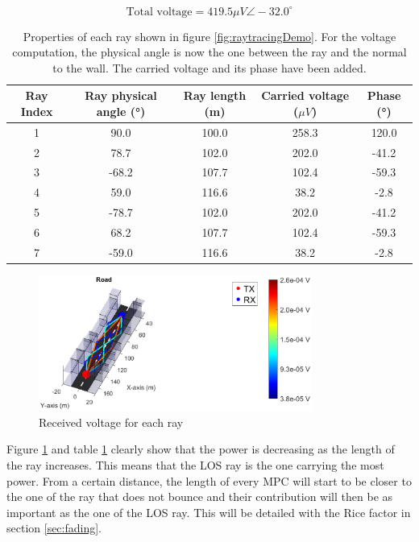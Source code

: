 \documentclass[10pt,a4paper]{ULBreport}
\begin{document}
\begin{equation*}
    \text{Total voltage} = 419.5 \mu V \angle -32.0^\circ
\end{equation*}

\begin{table}[H]
    \centering
    \begin{tabular}{|c|c c c c|}
        \hline
        Ray Index & Ray physical angle (°) & Ray length (m) & Carried voltage ($\mu V$) & Phase (°) \\ \hline
        1 & 90.0 & 100.0 & 258.3 & 120.0\\ \hline
        2 & 78.7 & 102.0 & 202.0 & -41.2\\ \hline
        3 & -68.2 & 107.7 & 102.4 & -59.3\\ \hline
        4 & 59.0 & 116.6 & 38.2 & -2.8\\ \hline
        5 & -78.7 & 102.0 & 202.0 & -41.2\\ \hline
        6 & 68.2 & 107.7 & 102.4 & -59.3\\ \hline
        7 & -59.0 & 116.6 & 38.2 & -2.8\\ \hline
    \end{tabular}
    \caption{Properties of each ray shown in figure \ref{fig:raytracingDemo}. For the voltage computation, the physical angle is now the one between the ray and the normal to the wall. The carried voltage and its phase have been added.}
    \label{tab:ray_properties}
\end{table}

\begin{figure}
    \centering
    \includegraphics[width=0.8\textwidth]{3_2.eps}
    \caption{Received voltage for each ray}
    \label{fig:voltageDemo}
\end{figure}

Figure \ref{fig:voltageDemo} and table \ref{tab:ray_properties} clearly show that the power is decreasing as the length of the ray increases. This means that the LOS ray is the one carrying the most power. From a certain distance, the length of every MPC will start to be closer to the one of the ray that does not bounce and their contribution will then be as important as the one of the LOS ray. This will be detailed with the Rice factor in section \ref{sec:fading}.
\end{document}
